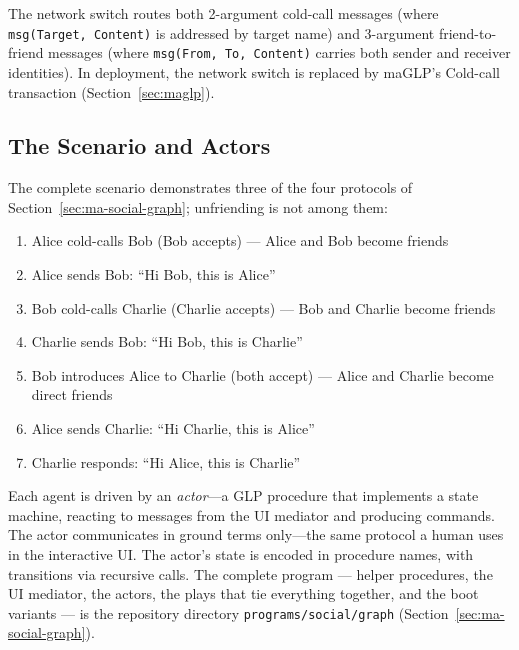 The network switch routes both 2-argument cold-call messages (where \verb|msg(Target, Content)| is addressed by target name) and 3-argument friend-to-friend messages (where \verb|msg(From, To, Content)| carries both sender and receiver identities). In deployment, the network switch is replaced by maGLP's Cold-call transaction (Section~\ref{sec:maglp}).

\subsection{The Scenario and Actors}

The complete scenario demonstrates three of the four protocols of Section~\ref{sec:ma-social-graph}; unfriending is not among them:
\begin{enumerate}
\item Alice cold-calls Bob (Bob accepts) --- Alice and Bob become friends
\item Alice sends Bob: ``Hi Bob, this is Alice''
\item Bob cold-calls Charlie (Charlie accepts) --- Bob and Charlie become friends
\item Charlie sends Bob: ``Hi Bob, this is Charlie''
\item Bob introduces Alice to Charlie (both accept) --- Alice and Charlie become direct friends
\item Alice sends Charlie: ``Hi Charlie, this is Alice''
\item Charlie responds: ``Hi Alice, this is Charlie''
\end{enumerate}

Each agent is driven by an \emph{actor}---a GLP procedure that implements a state machine, reacting to messages from the UI mediator and producing commands. The actor communicates in ground terms only---the same protocol a human uses in the interactive UI. The actor's state is encoded in procedure names, with transitions via recursive calls. The complete program --- helper procedures, the UI mediator, the actors, the plays that tie everything together, and the boot variants --- is the repository directory \verb|programs/social/graph| (Section~\ref{sec:ma-social-graph}).
